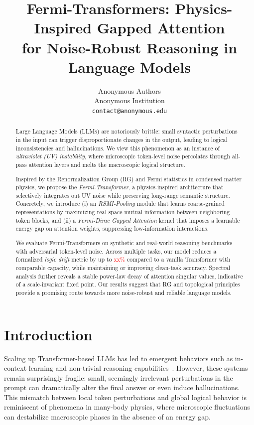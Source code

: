 \documentclass{article}
\title{Fermi-Transformers: Physics-Inspired Gapped Attention \\ for Noise-Robust Reasoning in Language Models}
\author{%
  Anonymous Authors \\
  Anonymous Institution \\
  \texttt{contact@anonymous.edu} \\
}
\date{}
\newcommand{\TODO}[1]{\textcolor{red}{#1}}
\begin{document}
\maketitle

\begin{abstract}
Large Language Models (LLMs) are notoriously brittle: small syntactic perturbations in the input can trigger disproportionate changes in the output, leading to logical inconsistencies and hallucinations. We view this phenomenon as an instance of \emph{ultraviolet (UV) instability}, where microscopic token-level noise percolates through all-pass attention layers and melts the macroscopic logical structure. 

Inspired by the Renormalization Group (RG) and Fermi statistics in condensed matter physics, we propose the \emph{Fermi-Transformer}, a physics-inspired architecture that selectively integrates out UV noise while preserving long-range semantic structure. Concretely, we introduce (i) an \emph{RSMI-Pooling} module that learns coarse-grained representations by maximizing real-space mutual information between neighboring token blocks, and (ii) a \emph{Fermi-Dirac Gapped Attention} kernel that imposes a learnable energy gap on attention weights, suppressing low-information interactions.

We evaluate Fermi-Transformers on synthetic and real-world reasoning benchmarks with adversarial token-level noise. Across multiple tasks, our model reduces a formalized \emph{logic drift} metric by up to \TODO{xx\%} compared to a vanilla Transformer with comparable capacity, while maintaining or improving clean-task accuracy. Spectral analysis further reveals a stable power-law decay of attention singular values, indicative of a scale-invariant fixed point. Our results suggest that RG and topological principles provide a promising route towards more noise-robust and reliable language models.
\end{abstract}

\section{Introduction}

Scaling up Transformer-based LLMs has led to emergent behaviors such as in-context learning and non-trivial reasoning capabilities~\cite{kaplan2020scaling}. However, these systems remain surprisingly fragile: small, seemingly irrelevant perturbations in the prompt can dramatically alter the final answer or even induce hallucinations. This mismatch between local token perturbations and global logical behavior is reminiscent of phenomena in many-body physics, where microscopic fluctuations can destabilize macroscopic phases in the absence of an energy gap.
\end{document}
